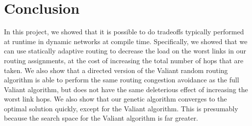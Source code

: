 \section{Conclusion}
\label{sec:conclusion}
In this project, we showed that it is possible to do tradeoffs typically performed at runtime in dynamic networks at compile time. Specifically, we showed that we can use statically adaptive routing to decrease the load on the worst links in our routing assignments, at the cost of increasing the total number of hops that are taken. We also show that a directed version of the Valiant random routing algorithm is able to perform the same routing congestion avoidance as the full Valiant algorithm, but does not have the same deleterious effect of increasing the worst link hops. We also show that our genetic algorithm converges to the optimal solution quickly, except for the Valiant algorithm. This is presumably because the search space for the Valiant algorithm is far greater.
